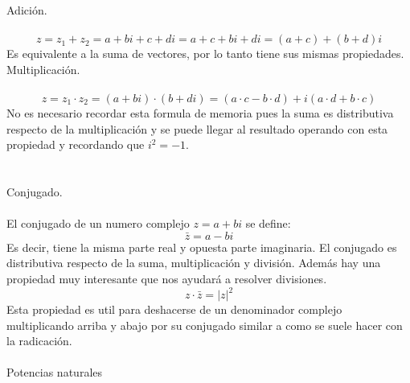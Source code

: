 \documentclass[]{article}
\begin{document}
\Large Adición.
\normalsize
\\
\\
$$
z = z_1 +z_2 = a+bi + c+di = a+c+bi+di = (a+c) + (b+d) i
$$
Es equivalente a la suma de vectores, por lo tanto tiene sus mismas propiedades.
\Large Multiplicación.
\normalsize
\\
\\
$$
z = z_1 \cdot z_2 = (a+bi)\cdot(b+di) = (a\cdot c - b\cdot d) + i(a\cdot d + b \cdot c) 
$$
No es necesario recordar esta formula de memoria pues la suma es distributiva respecto de la multiplicación y se puede llegar al resultado operando con esta propiedad y recordando que $i^{2} = -1$.
\\
\\\\
\Large Conjugado.
\normalsize
\\
\\
El conjugado de un numero complejo $z=a+bi$ se define:
$$
\bar{z} = a - bi
$$
Es decir, tiene la misma parte real y opuesta parte imaginaria. El conjugado es distributiva respecto de la suma, multiplicación y división. Además hay una propiedad muy interesante que nos ayudará a resolver divisiones.
$$
z \cdot \bar{z} = |z|^{2}
$$
Esta propiedad es util para deshacerse de un denominador complejo multiplicando arriba y abajo por su conjugado similar a como se suele hacer con la radicación.
\\
\\
\Large Potencias naturales
\normalsize
\\
\\
\end{document}
